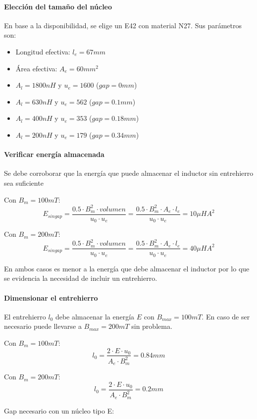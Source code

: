 \paragraph{Elección del tamaño del núcleo}
En base a la disponibilidad, se elige un E42 con material N27. 
Sus parámetros son:
\begin{itemize}
    \item Longitud efectiva: $l_e=67mm$
    \item Área efectiva: $A_e=60{mm}^2$
    \item $A_l=1800nH$ y $u_e=1600$ ($gap=0mm$)
    \item $A_l=630nH$ y $u_e=562$ ($gap=0.1mm$)
    \item $A_l=400nH$ y $u_e=353$ ($gap=0.18mm$)
    \item $A_l=200nH$ y $u_e=179$ ($gap=0.34mm$)
\end{itemize}

\paragraph{Verificar energía almacenada}

Se debe corroborar que la energía que puede almacenar el inductor sin entrehierro sea suficiente

Con $B_m=100mT$:
$$ E_{singap}=\frac{0.5\cdot B_m^2\cdot {volumen}}{u_0\cdot u_e}=\frac{0.5\cdot B_m^2\cdot A_e\cdot l_e}{u_0\cdot u_e}=10\mu HA^2 $$

Con $B_m=200mT$:
$$ E_{singap}=\frac{0.5\cdot B_m^2\cdot {volumen}}{u_0\cdot u_e}=\frac{0.5\cdot B_m^2\cdot A_e\cdot l_e}{u_0\cdot u_e}=40\mu HA^2 $$

En ambos casos es menor a la energía que debe almacenar el inductor por lo que se evidencia la necesidad de incluir un entrehierro. 

\paragraph{Dimensionar el entrehierro}

El entrehierro $l_0$ debe almacenar la energía $E$ con $B_{max}=100mT$.
En caso de ser necesario puede llevarse a $B_{max}=200mT$ sin problema. 

Con $B_m=100mT$:
$$ l_0=\frac{2\cdot E\cdot u_0}{A_e\cdot B_m^2}=0.84mm $$

Con $B_m=200mT$:
$$ l_0=\frac{2\cdot E\cdot u_0}{A_e\cdot B_m^2}=0.2mm $$

Gap necesario con un núcleo tipo E:

